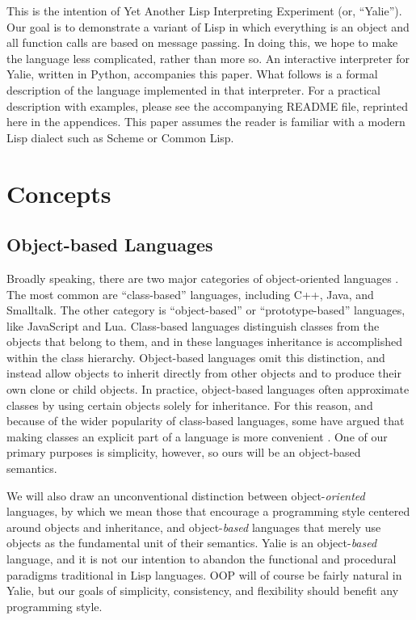 \documentclass[twocolumn]{article}
\begin{document}
This is the intention of Yet Another Lisp Interpreting Experiment (or,
``Yalie''). Our goal is to demonstrate a variant of Lisp in which
everything is an object and all function calls are based on message
passing. In doing this, we hope to make the language less complicated,
rather than more so. An interactive interpreter for Yalie, written in
Python, accompanies this paper. What follows is a formal description
of the language implemented in that interpreter. For a practical
description with examples, please see the accompanying README file,
reprinted here in the appendices. This paper assumes the reader is
familiar with a modern Lisp dialect such as Scheme or Common Lisp.

\section*{Concepts}
\subsection*{Object-based Languages}
Broadly speaking, there are two major categories of object-oriented
languages \cite{Abadi}. The most common are ``class-based'' languages,
including C++, Java, and Smalltalk. The other category is
``object-based'' or ``prototype-based'' languages, like JavaScript and
Lua. Class-based languages distinguish classes from the objects that
belong to them, and in these languages inheritance is accomplished
within the class hierarchy. Object-based languages omit this
distinction, and instead allow objects to inherit directly from other
objects and to produce their own clone or child objects. In practice,
object-based languages often approximate classes by using certain
objects solely for inheritance. For this reason, and because of the
wider popularity of class-based languages, some have argued that
making classes an explicit part of a language is more convenient
\cite{Bruce}. One of our primary purposes is simplicity, however, so
ours will be an object-based semantics.

We will also draw an unconventional distinction between
object-\emph{oriented} languages, by which we mean those that
encourage a programming style centered around objects and inheritance,
and object-\emph{based} languages that merely use objects as the
fundamental unit of their semantics. Yalie is an object-\emph{based}
language, and it is not our intention to abandon the functional and
procedural paradigms traditional in Lisp languages. OOP will of course
be fairly natural in Yalie, but our goals of simplicity, consistency,
and flexibility should benefit any programming style.
\end{document}
